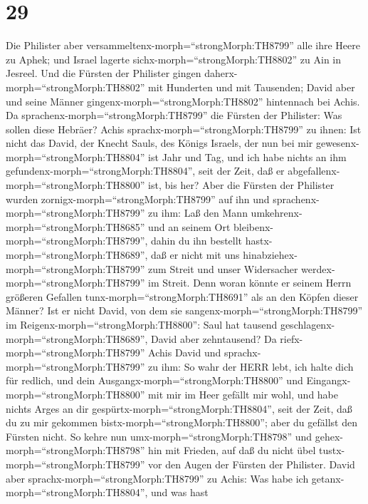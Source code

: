 \hypertarget{section-28}{%
\section{29}\label{section-28}}

 Die Philister aber
versammeltenx-morph=``strongMorph:TH8799'' alle ihre Heere zu Aphek; und
Israel lagerte sichx-morph=``strongMorph:TH8802'' zu Ain in Jesreel.
 Und die Fürsten der Philister gingen
daherx-morph=``strongMorph:TH8802'' mit Hunderten und mit Tausenden;
David aber und seine Männer gingenx-morph=``strongMorph:TH8802''
hintennach bei Achis.  Da
sprachenx-morph=``strongMorph:TH8799'' die Fürsten der Philister: Was
sollen diese Hebräer? Achis sprachx-morph=``strongMorph:TH8799'' zu
ihnen: Ist nicht das David, der Knecht Sauls, des Königs Israels, der
nun bei mir gewesenx-morph=``strongMorph:TH8804'' ist Jahr und Tag, und
ich habe nichts an ihm gefundenx-morph=``strongMorph:TH8804'', seit der
Zeit, daß er abgefallenx-morph=``strongMorph:TH8800'' ist, bis her?
 Aber die Fürsten der Philister wurden
zornigx-morph=``strongMorph:TH8799'' auf ihn und
sprachenx-morph=``strongMorph:TH8799'' zu ihm: Laß den Mann
umkehrenx-morph=``strongMorph:TH8685'' und an seinem Ort
bleibenx-morph=``strongMorph:TH8799'', dahin du ihn bestellt
hastx-morph=``strongMorph:TH8689'', daß er nicht mit uns
hinabziehex-morph=``strongMorph:TH8799'' zum Streit und unser
Widersacher werdex-morph=``strongMorph:TH8799'' im Streit. Denn woran
könnte er seinem Herrn größeren Gefallen
tunx-morph=``strongMorph:TH8691'' als an den Köpfen dieser Männer?
 Ist er nicht David, von dem sie
sangenx-morph=``strongMorph:TH8799'' im
Reigenx-morph=``strongMorph:TH8800'': Saul hat tausend
geschlagenx-morph=``strongMorph:TH8689'', David aber zehntausend?
 Da riefx-morph=``strongMorph:TH8799'' Achis David und
sprachx-morph=``strongMorph:TH8799'' zu ihm: So wahr der HERR lebt, ich
halte dich für redlich, und dein Ausgangx-morph=``strongMorph:TH8800''
und Eingangx-morph=``strongMorph:TH8800'' mit mir im Heer gefällt mir
wohl, und habe nichts Arges an dir
gespürtx-morph=``strongMorph:TH8804'', seit der Zeit, daß du zu mir
gekommen bistx-morph=``strongMorph:TH8800''; aber du gefällst den
Fürsten nicht.  So kehre nun
umx-morph=``strongMorph:TH8798'' und gehex-morph=``strongMorph:TH8798''
hin mit Frieden, auf daß du nicht übel
tustx-morph=``strongMorph:TH8799'' vor den Augen der Fürsten der
Philister.  David aber sprachx-morph=``strongMorph:TH8799''
zu Achis: Was habe ich getanx-morph=``strongMorph:TH8804'', und was hast
